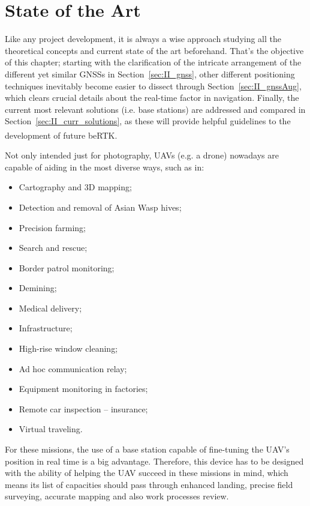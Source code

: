 

\glsresetall
\chapter{State of the Art}\label{cha:II_SotA}

Like any project development, it is always a wise approach studying all the theoretical concepts and current state of the art beforehand. That's the objective of this chapter;
starting with the clarification of the intricate arrangement of the different yet similar GNSSs in Section~\ref{sec:II_gnss}, other different positioning techniques inevitably become easier to dissect through Section~\ref{sec:II_gnssAug}, which clears crucial details about the real-time factor in navigation.
Finally, the current most relevant solutions (i.e. base stations) are addressed and compared in Section~\ref{sec:II_curr_solutions}, as these will provide helpful guidelines to the development of future beRTK\textsuperscript{\textregistered}.

Not only intended just for photography, UAVs (e.g. a drone) nowadays are capable of aiding in the most diverse ways, such as in:

\begin{itemize}
    \item Cartography and 3D mapping;
    \item Detection and removal of Asian Wasp hives;
    \item Precision farming;
    \item Search and rescue;
    \item Border patrol monitoring;
    \item Demining;
    \item Medical delivery;
    \item Infrastructure;
    \item High-rise window cleaning;
    \item Ad hoc communication relay;
    \item Equipment monitoring in factories;
    \item Remote car inspection -- insurance;
    \item Virtual traveling.
\end{itemize}
For these missions, the use of a base station capable of fine-tuning the UAV's position in real time is a big advantage. Therefore, this device has to be designed with the ability of helping the UAV succeed in these missions in mind, which means its list of capacities should pass through enhanced landing, precise field surveying, accurate mapping and also work processes review.

